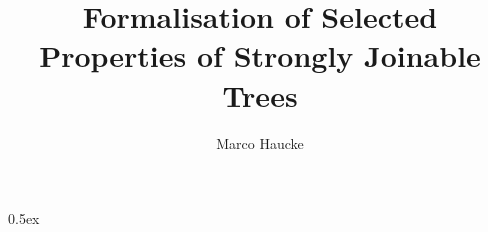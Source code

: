 \documentclass[11pt,a4paper]{article}
\begin{document}
\title{Formalisation of Selected Properties of Strongly Joinable Trees}
\author{Marco Haucke}
\maketitle

\tableofcontents

\parindent 0pt\parskip 0.5ex






\end{document}
